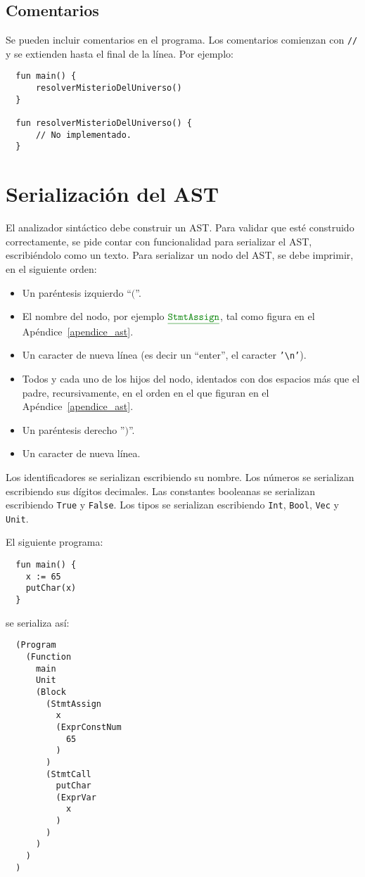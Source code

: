 \documentclass{article}
\renewcommand{\ast}[1]{\textcolor{darkgreen}{\texttt{\underline{#1}}}}
\begin{document}
\subsection{Comentarios}

Se pueden incluir comentarios en el programa.
Los comentarios comienzan con \texttt{//} y se extienden hasta
el final de la l\'inea. Por ejemplo:

  \begin{lstlisting}
  fun main() {
      resolverMisterioDelUniverso()
  }

  fun resolverMisterioDelUniverso() {
      // No implementado.
  }
  \end{lstlisting}

\section{Serializaci\'on del AST}
\label{serializacion_ast}

El analizador sint\'actico debe construir un AST.
Para validar que est\'e construido correctamente, se pide
contar con funcionalidad para serializar el AST, escribi\'endolo como
un texto.
Para serializar un nodo del AST, se debe imprimir, en el siguiente orden:
\begin{itemize}
\item Un par\'entesis izquierdo ``$($''.
\item El nombre del nodo, por ejemplo $\ast{StmtAssign}$, tal como figura en el Ap\'endice~\ref{apendice_ast}.
\item Un caracter de nueva l\'inea (es decir un ``enter'', el caracter \texttt{'\textbackslash{n}'}).
\item Todos y cada uno de los hijos del nodo, identados con dos espacios m\'as que el padre,
      recursivamente, en el orden en el que figuran en el Ap\'endice~\ref{apendice_ast}.
\item Un par\'entesis derecho ''$)$''.
\item Un caracter de nueva l\'inea.
\end{itemize}
Los identificadores se serializan escribiendo su nombre.
Los n\'umeros se serializan escribiendo sus d\'igitos decimales.
Las constantes booleanas se serializan escribiendo \texttt{True} y \texttt{False}.
Los tipos se serializan escribiendo \texttt{Int}, \texttt{Bool}, \texttt{Vec} y \texttt{Unit}.
\bigskip

El siguiente programa:
\begin{lstlisting}
  fun main() {
    x := 65
    putChar(x)
  }
\end{lstlisting}
se serializa as\'i:
\begin{lstlisting}
  (Program
    (Function
      main
      Unit
      (Block
        (StmtAssign
          x
          (ExprConstNum
            65
          )
        )
        (StmtCall
          putChar
          (ExprVar
            x
          )
        )
      )
    )
  )
\end{lstlisting}
\end{document}

